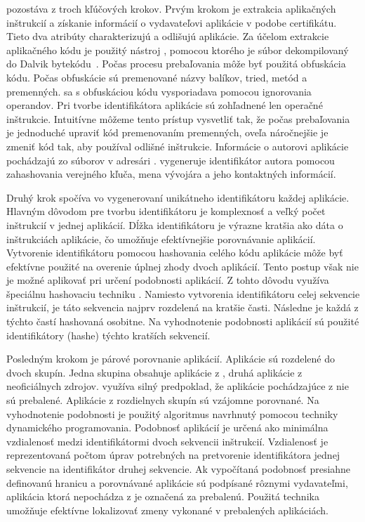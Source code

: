  pozostáva z troch kľúčových krokov. Prvým krokom je extrakcia aplikačných inštrukcií a získanie informácií o vydavateľovi aplikácie v podobe certifikátu. Tieto dva atribúty charakterizujú a odlišujú aplikácie.
Za účelom extrakcie aplikačného kódu je použitý nástroj , pomocou ktorého je súbor  dekompilovaný do Dalvik bytekódu~\cite{smali}.  Počas procesu prebaľovania môže byť použitá obfuskácia kódu. Počas obfuskácie sú premenované názvy balíkov, tried, metód a premenných.  sa s obfuskáciou kódu vysporiadava pomocou ignorovania operandov. Pri tvorbe identifikátora aplikácie sú zohľadnené len operačné inštrukcie. Intuitívne môžeme tento prístup vysvetliť tak, že počas prebaľovania je jednoduché upraviť kód premenovaním premenných, oveľa náročnejšie je zmeniť kód tak, aby používal odlišné inštrukcie. 
Informácie o autorovi aplikácie pochádzajú zo súborov v adresári .  vygeneruje identifikátor autora pomocou zahashovania verejného kľuča, mena vývojára a jeho kontaktných informácií. 


Druhý krok spočíva vo vygenerovaní unikátneho identifikátoru každej aplikácie. Hlavným dôvodom pre tvorbu identifikátoru je komplexnosť a veľký počet inštrukcií v jednej aplikácií. Dĺžka identifikátoru je výrazne kratšia ako dáta o inštrukciách aplikácie, čo umožňuje efektívnejšie porovnávanie aplikácií. 
Vytvorenie identifikátoru pomocou hashovania celého kódu aplikácie môže byť efektívne použité na overenie úplnej zhody dvoch aplikácií. Tento postup však nie je možné aplikovať pri určení podobnosti aplikácií.  Z tohto dôvodu využíva  špeciálnu hashovaciu techniku  \cite{fuzzyHashing}. Namiesto vytvorenia identifikátoru celej sekvencie inštrukcií, je táto sekvencia najprv rozdelená na kratšie časti. Následne je každá z týchto častí hashovaná osobitne. Na vyhodnotenie podobnosti aplikácií sú použité identifikátory (hashe) týchto kratších sekvencií.


Posledným krokom je párové porovnanie aplikácií. Aplikácie sú  rozdelené do dvoch skupín. Jedna skupina obsahuje aplikácie z , druhá aplikácie z neoficiálnych zdrojov.   využíva silný predpoklad, že aplikácie pochádzajúce z  nie sú prebalené. 
Aplikácie z rozdielnych skupín sú vzájomne porovnané. Na vyhodnotenie podobnosti je použitý algoritmus navrhnutý pomocou techniky dynamického programovania. Podobnosť aplikácií je určená ako minimálna vzdialenosť medzi identifikátormi dvoch sekvencii inštrukcií.  Vzdialenosť je reprezentovaná počtom úprav potrebných na pretvorenie identifikátora jednej sekvencie na identifikátor druhej sekvencie. Ak vypočítaná podobnosť presiahne definovanú hranicu a porovnávané aplikácie sú podpísané rôznymi vydavateľmi, aplikácia ktorá nepochádza z  je označená za prebalenú. Použitá technika umožňuje efektívne lokalizovať zmeny vykonané v prebalených aplikáciách. 

